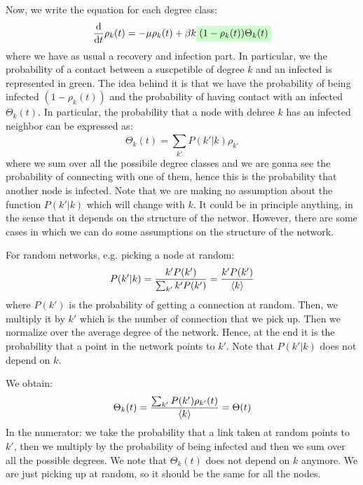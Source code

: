 \documentclass[../main/main.tex]{subfiles}
\begin{document}
Now, we write the equation for each degree class:
\begin{equation}
  \dv{}{t}  \rho _k (t) = - \mu \rho _k (t) + \beta k \mathcolorbox{green!20}{(1- \rho _k (t)) \Theta _k (t)}
\end{equation}
where we have as usual a recovery and infection part.
In particular, we the probability of a contact between a suscpetible of degree \( k \) and an infected is represented in green.
The idea behind it is that we have the probability of being infected \( (1- \rho _k (t)) \) and the probability of having contact with an infected \( \Theta _k (t) \).
In particular, the probability that a node with dehree \( k \) has an infected neighbor can be expressed as:
\begin{equation}
  \Theta _k(t) = \sum_{k'}^{} P(k'|k)\rho _{k'}
\end{equation}
where we  sum over all the possibile degree classes and we are gonna see the probability of connecting with one of them, hence this is the probability that another node is infected.
Note that we are making no assumption about the function \(  P(k'|k) \) which will change with \( k \). It could be in principle anything, in the sense that it depends on the structure of the networ. However, there are some cases in which we can do some assumptions on the structure of the network.

For random networks, e.g. picking a node at random:
\begin{equation}
  P(k'|k) = \frac{k'P(k')}{\sum_{k'}^{} k' P(k')  } = \frac{k'P(k')}{\expval{k}  }
\end{equation}
where \( P(k') \) is the probability of getting a connection at random. Then, we multiply it by \( k' \) which is the number of connection that we pick up. Then we normalize over the average degree of the network.  Hence, at the end it is the probability that a point in the network points to \( k' \).  Note that \( P(k'|k) \) does not depend on \( k \).

We obtain:
\begin{equation*}
  \Theta _k (t) = \frac{\sum_{k'}^{} P(k') \rho _{k'} (t)  }{\expval{k} } = \Theta (t)
\end{equation*}
In the numerator: we take the probability that a link taken at random points to \( k' \), then we multiply by the probability of being infected and then we sum over all the possible degrees.
We note that \( \Theta _k (t) \) does not depend on \( k \) anymore. We are just picking up at random, so it should be the same for all the nodes.
\end{document}
